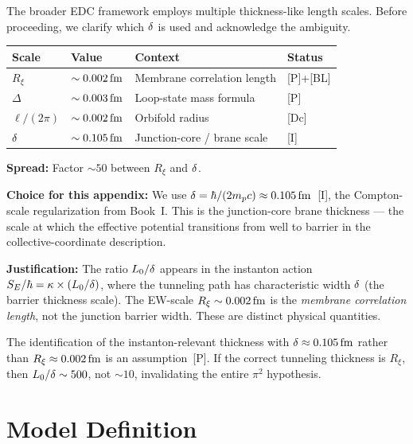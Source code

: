 The broader EDC framework employs multiple thickness-like length scales. Before
proceeding, we clarify which $\delta$ is used and acknowledge the ambiguity.

\begin{center}
\begin{tabular}{llll}
\toprule
\textbf{Scale} & \textbf{Value} & \textbf{Context} & \textbf{Status} \\
\midrule
$R_\xi$     & $\sim 0.002\,\mathrm{fm}$ & Membrane correlation length       & [P]+[BL] \\
$\Delta$    & $\sim 0.003\,\mathrm{fm}$ & Loop-state mass formula            & [P] \\
$\ell/(2\pi)$ & $\sim 0.002\,\mathrm{fm}$ & Orbifold radius                 & [Dc] \\
$\delta$   & $\sim 0.105\,\mathrm{fm}$ & Junction-core / brane scale       & [I] \\
\bottomrule
\end{tabular}
\end{center}

\textbf{Spread:} Factor $\sim 50$ between $R_\xi$ and $\delta$.

\textbf{Choice for this appendix:}
We use $\delta = \hbar/(2 m_p c) \approx 0.105\,\mathrm{fm}$~[I], the Compton-scale
regularization from Book~I. This is the junction-core brane thickness --- the
scale at which the effective potential transitions from well to barrier in the
collective-coordinate description.

\textbf{Justification:} The ratio $L_0/\delta$ appears in the instanton action
$S_E/\hbar = \kappa \times (L_0/\delta)$, where the tunneling path has
characteristic width $\delta$ (the barrier thickness scale). The EW-scale
$R_\xi \sim 0.002\,\mathrm{fm}$ is the \emph{membrane correlation length}, not the junction
barrier width. These are distinct physical quantities.

\begin{edcopenbox}[title=Residual Risk: Delta Identification]
    The identification of the instanton-relevant thickness with $\delta \approx
    0.105\,\mathrm{fm}$ rather than $R_\xi \approx 0.002\,\mathrm{fm}$ is an assumption~[P]. If the
    correct tunneling thickness is $R_\xi$, then $L_0/\delta \sim 500$, not
    $\sim 10$, invalidating the entire $\pi^2$ hypothesis.
    \tagP
\end{edcopenbox}

\section{Model Definition}
\label{sec:L0d:model}

